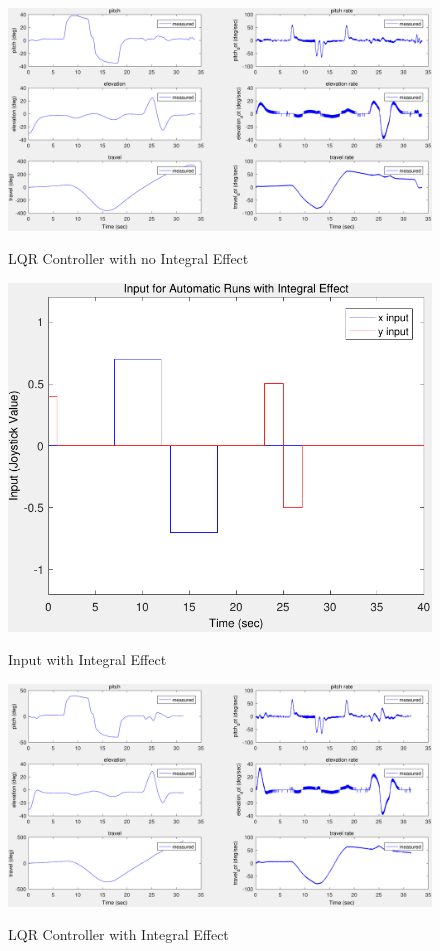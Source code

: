 \begin{figure}
\caption{LQR Controller with no Integral Effect}
	\centering
		\includegraphics[scale =0.4]{images/532_LQR_NoEstimator.pdf}
	\label{fig:LQR_noEstimator}
\end{figure}

\begin{figure}
\caption{Input with Integral Effect}
	\centering
		\includegraphics[scale =0.6]{images/input_IntegralEffect.pdf}
	\label{fig:Input_IntegralEffect}
\end{figure}

\begin{figure}[hpb]
\caption{LQR Controller with Integral Effect}
	\centering
		\includegraphics[scale =0.4]{images/533_LQRIntegralEffect_NoEstimator.pdf}
	\label{fig:LQRIntegralEffect_noEstimator}
\end{figure}


